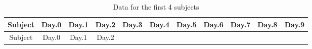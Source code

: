 \documentclass[]{article}
\theoremstyle{definition}
\theoremstyle{definition}
\theoremstyle{definition}
\theoremstyle{remark}
\begin{document}
\begin{longtable}[]{@{}ccccccccccc@{}}
\caption{Data for the first 4 subjects}\tabularnewline
\toprule
\begin{minipage}[b]{0.08\columnwidth}\centering\strut
Subject\strut
\end{minipage} & \begin{minipage}[b]{0.06\columnwidth}\centering\strut
Day.0\strut
\end{minipage} & \begin{minipage}[b]{0.06\columnwidth}\centering\strut
Day.1\strut
\end{minipage} & \begin{minipage}[b]{0.06\columnwidth}\centering\strut
Day.2\strut
\end{minipage} & \begin{minipage}[b]{0.06\columnwidth}\centering\strut
Day.3\strut
\end{minipage} & \begin{minipage}[b]{0.06\columnwidth}\centering\strut
Day.4\strut
\end{minipage} & \begin{minipage}[b]{0.06\columnwidth}\centering\strut
Day.5\strut
\end{minipage} & \begin{minipage}[b]{0.06\columnwidth}\centering\strut
Day.6\strut
\end{minipage} & \begin{minipage}[b]{0.06\columnwidth}\centering\strut
Day.7\strut
\end{minipage} & \begin{minipage}[b]{0.06\columnwidth}\centering\strut
Day.8\strut
\end{minipage} & \begin{minipage}[b]{0.06\columnwidth}\centering\strut
Day.9\strut
\end{minipage}\tabularnewline
\midrule
\endfirsthead
\toprule
\begin{minipage}[b]{0.08\columnwidth}\centering\strut
Subject\strut
\end{minipage} & \begin{minipage}[b]{0.06\columnwidth}\centering\strut
Day.0\strut
\end{minipage} & \begin{minipage}[b]{0.06\columnwidth}\centering\strut
Day.1\strut
\end{minipage} & \begin{minipage}[b]{0.06\columnwidth}\centering\strut
Day.2\strut
\end{minipage} & \begin{minipage}[b]{0.06\columnwidth}\centering\strut

\end{minipage}
\end{longtable}
\end{document}
